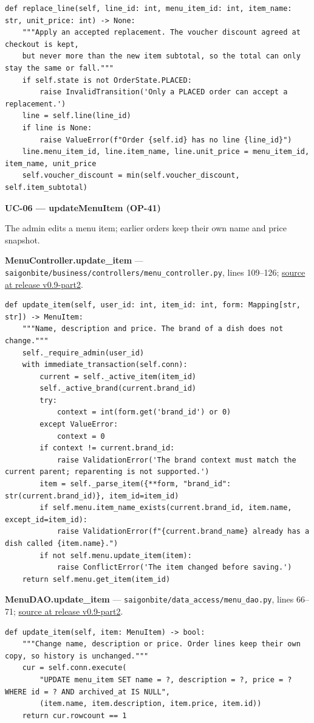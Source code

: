 \begin{lstlisting}
def replace_line(self, line_id: int, menu_item_id: int, item_name: str, unit_price: int) -> None:
    """Apply an accepted replacement. The voucher discount agreed at checkout is kept,
    but never more than the new item subtotal, so the total can only stay the same or fall."""
    if self.state is not OrderState.PLACED:
        raise InvalidTransition('Only a PLACED order can accept a replacement.')
    line = self.line(line_id)
    if line is None:
        raise ValueError(f"Order {self.id} has no line {line_id}")
    line.menu_item_id, line.item_name, line.unit_price = menu_item_id, item_name, unit_price
    self.voucher_discount = min(self.voucher_discount, self.item_subtotal)
\end{lstlisting}
\textbf{UC-06 --- updateMenuItem (OP-41)}

The admin edits a menu item; earlier orders keep their own name and price snapshot.

\textbf{MenuController.update\_item} --- \texttt{saigonbite/\allowbreak{}business/\allowbreak{}controllers/\allowbreak{}menu\_\allowbreak{}controller.\allowbreak{}py}, lines 109--126; \href{\TargetRepo\detokenize{/blob/v0.9-part2/saigonbite/business/controllers/menu_controller.py#L109-L126}}{source at release v0.9-part2}.

\begin{lstlisting}
def update_item(self, user_id: int, item_id: int, form: Mapping[str, str]) -> MenuItem:
    """Name, description and price. The brand of a dish does not change."""
    self._require_admin(user_id)
    with immediate_transaction(self.conn):
        current = self._active_item(item_id)
        self._active_brand(current.brand_id)
        try:
            context = int(form.get('brand_id') or 0)
        except ValueError:
            context = 0
        if context != current.brand_id:
            raise ValidationError('The brand context must match the current parent; reparenting is not supported.')
        item = self._parse_item({**form, "brand_id": str(current.brand_id)}, item_id=item_id)
        if self.menu.item_name_exists(current.brand_id, item.name, except_id=item_id):
            raise ValidationError(f"{current.brand_name} already has a dish called {item.name}.")
        if not self.menu.update_item(item):
            raise ConflictError('The item changed before saving.')
    return self.menu.get_item(item_id)
\end{lstlisting}
\textbf{MenuDAO.update\_item} --- \texttt{saigonbite/\allowbreak{}data\_\allowbreak{}access/\allowbreak{}menu\_\allowbreak{}dao.\allowbreak{}py}, lines 66--71; \href{\TargetRepo\detokenize{/blob/v0.9-part2/saigonbite/data_access/menu_dao.py#L66-L71}}{source at release v0.9-part2}.

\begin{lstlisting}
def update_item(self, item: MenuItem) -> bool:
    """Change name, description or price. Order lines keep their own copy, so history is unchanged."""
    cur = self.conn.execute(
        "UPDATE menu_item SET name = ?, description = ?, price = ? WHERE id = ? AND archived_at IS NULL",
        (item.name, item.description, item.price, item.id))
    return cur.rowcount == 1
\end{lstlisting}
